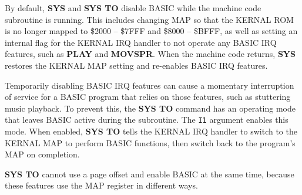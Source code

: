 By default, {\bf SYS} and {\bf SYS TO} disable BASIC while the machine code subroutine is running. This includes changing MAP so that the KERNAL ROM is no longer mapped to \$2000 -- \$7FFF and \$8000 -- \$BFFF, as well as setting an internal flag for the KERNAL IRQ handler to not operate any BASIC IRQ features, such as {\bf PLAY} and {\bf MOVSPR}. When the machine code returns, {\bf SYS} restores the KERNAL MAP setting and re-enables BASIC IRQ features.

Temporarily disabling BASIC IRQ features can cause a momentary interruption of service for a BASIC program that relies on those features, such as stuttering music playback. To prevent this, the {\bf SYS TO} command has an operating mode that leaves BASIC active during the subroutine. The \texttt{I1} argument enables this mode. When enabled, {\bf SYS TO} tells the KERNAL IRQ handler to switch to the KERNAL MAP to perform BASIC functions, then switch back to the program's MAP on completion.


{\bf SYS TO} cannot use a page offset and enable BASIC at the same time, because these features use the MAP register in different ways.